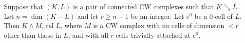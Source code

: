 Suppose that $(K, L)$ is a pair of connected CW complexes such that $K \searrow L$. Let $n = \dim(K-L)$ and let $r \geq n-1$ be an integer. Let $e^0$ be a 0-cell of $L$. Then $K \wedge M$, rel $L$, where $M$ is a CW complex with no cells of dimension $< r$ other than those in $L$, and with all $r$-cells trivially attached at $e^0$.
